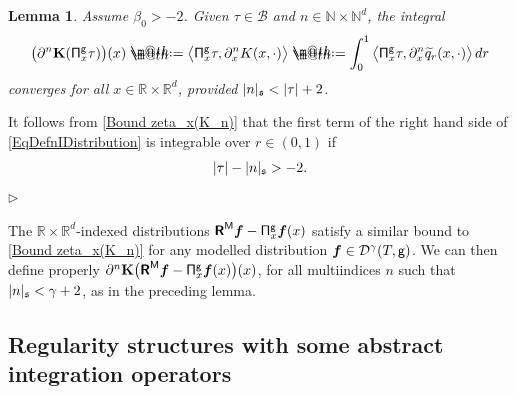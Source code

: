 \documentclass[10pt, reqno]{amsart}
\makeatletter
\numberwithin{subsection}{section}
\numberwithin{subsubsection}{subsection}
\numberwithin{equation}{section} %
\newenvironment{Dem}[1][\unskip]{%
    \begin{list}{\hspace{1.15cm}{\sf \textbf{{\small Proof #1 --}}}}{%
        \setlength{\topsep}{0pt}%
        \setlength{\leftmargin}{0pt}%
        \setlength{\rightmargin}{0pt}%
        \setlength{\listparindent}{0pt}%
        \setlength{\itemindent}{0pt}%
        \setlength{\parsep}{0pt}%
        \addtolength{\leftmargin}{0pt}%
        \addtolength{\rightmargin}{0pt}%
    } \item }{\hfill $\rhd$\end{list}\smallskip}
\theoremstyle{mystyle}
\newtheorem{lem}[thm]{\hspace{-0.14cm}  {Lemma} }%
\theoremstyle{mystyle2}
\theoremstyle{mystyle3}
\newcommand{\bsf}{\boldsymbol{f}}
\newcommand\bbN{\mathbb{N}}
\newcommand\bbR{\mathbb{R}}
\newcommand{\mcB}{\mathcal{B}}
\newcommand{\mcD}{\mathcal{D}}
\newcommand*{\defeq}{\mathrel{\rlap{%
                     \raisebox{0.3ex}{$\m@th\cdot$}}%
                     \raisebox{-0.3ex}{$\m@th\cdot$}}%
                     =}
\makeatother
\begin{document}
\begin{lem} \label{LemmeDefnIDistribution}
Assume $\beta_0>-2$. Given $\tau\in \mcB$ and $n\in\bbN\times\bbN^d$, the 
integral
\begin{equation} \label{EqDefnIDistribution}
\big(\partial^n{\bf K}({\sf \Pi}^{\sf g}_x\tau)\big)(x) \defeq  \big\langle {\sf \Pi}^{\sf g}_x\tau , \partial_x^nK(x,\cdot)\big\rangle 
\defeq   
\int_0^1 \big\langle {\sf \Pi}^{\sf g}_x\tau , \partial_x^n \widetilde{q}_r (x,\cdot)\big\rangle\,dr
\end{equation}
converges for all $x\in\bbR\times\bbR^d$, provided $|n|_\frak{s}<\vert\tau\vert + 2$.
\end{lem}

\medskip

\begin{Dem}
It follows from \eqref{Bound zeta_x(K_n)} that the first term of the right hand side of \eqref{EqDefnIDistribution} is integrable over $r\in(0,1)$ 
if
$$
|\tau|-|n|_{\frak{s}} > -2.
$$
\end{Dem}

\medskip

The $\bbR\times\bbR^d$-indexed distributions $\textbf{\textsf{R}}^{\sf M}\bsf - {\sf \Pi}^{\sf g}_x\bsf(x)$ satisfy a similar bound to \eqref{Bound zeta_x(K_n)} for any modelled distribution $\bsf\in\mcD^\gamma(T,\sf g)$. We can then define properly $\partial^n{\bf K}\big(\textbf{\textsf{R}}^{\sf M}\bsf - {\sf \Pi}^{\sf g}_x\bsf(x)\big)(x)$, for all multiindices $n$ such that $\vert n\vert_\frak{s}<\gamma+2$, as in the preceding lemma.


\bigskip


\subsection{Regularity structures with some abstract integration operators}
\label{SubsectionIntegrationOperators}
\end{document}
